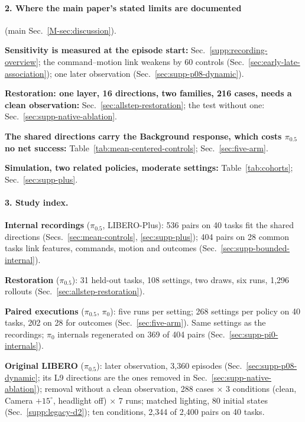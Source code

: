 \paragraph{2. Where the main paper's stated limits are documented} (main Sec.~\ref{M-sec:discussion}).
\begin{guidelist}
\item \textbf{Sensitivity is measured at the episode start:} Sec.~\ref{supp:recording-overview}; the command--motion link weakens by 60 controls (Sec.~\ref{sec:early-late-association}); one later observation (Sec.~\ref{sec:supp-p08-dynamic}).
\item \textbf{Restoration: one layer, 16 directions, two families, 216 cases, needs a clean observation:} Sec.~\ref{sec:allstep-restoration}; the test without one: Sec.~\ref{sec:supp-native-ablation}.
\item \textbf{The shared directions carry the Background response, which costs $\pi_{0.5}$ no net success:} Table~\ref{tab:mean-centered-controls}; Sec.~\ref{sec:five-arm}.
\item \textbf{Simulation, two related policies, moderate settings:} Table~\ref{tab:cohorts}; Sec.~\ref{sec:supp-plus}.
\end{guidelist}

\paragraph{3. Study index.}
\begin{guidelist}
\item \textbf{Internal recordings} ($\pi_{0.5}$, LIBERO-Plus): 536 pairs on 40 tasks fit the shared directions (Secs.~\ref{sec:mean-controls}, \ref{sec:supp-plus}); 404 pairs on 28 common tasks link features, commands, motion and outcomes (Sec.~\ref{sec:supp-bounded-internal}).
\item \textbf{Restoration} ($\pi_{0.5}$): 31 held-out tasks, 108 settings, two draws, six runs, 1,296 rollouts (Sec.~\ref{sec:allstep-restoration}).
\item \textbf{Paired executions} ($\pi_{0.5}$, $\pi_0$): five runs per setting; 268 settings per policy on 40 tasks, 202 on 28 for outcomes (Sec.~\ref{sec:five-arm}). Same settings as the recordings; $\pi_0$ internals regenerated on 369 of 404 pairs (Sec.~\ref{sec:supp-pi0-internals}).
\item \textbf{Original LIBERO} ($\pi_{0.5}$): later observation, 3,360 episodes (Sec.~\ref{sec:supp-p08-dynamic}; its L9 directions are the ones removed in Sec.~\ref{sec:supp-native-ablation}); removal without a clean observation, 288 cases $\times$ 3 conditions (clean, Camera $+15^\circ$, headlight off) $\times$ 7 runs; matched lighting, 80 initial states (Sec.~\ref{supp:legacy-d2}); ten conditions, 2,344 of 2,400 pairs on 40 tasks.
\end{guidelist}

